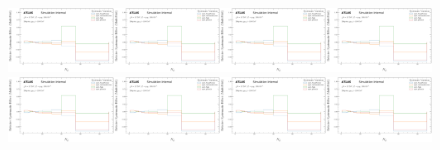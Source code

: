 \begin{figure}[h!]
\includegraphics[width=0.25\textwidth,page=9]{figures/SimResults/MultiFold_TrackJet_SystEffect.pdf}\includegraphics[width=0.25\textwidth,page=10]{figures/SimResults/MultiFold_TrackJet_SystEffect.pdf}\includegraphics[width=0.25\textwidth,page=11]{figures/SimResults/MultiFold_TrackJet_SystEffect.pdf}\includegraphics[width=0.25\textwidth,page=12]{figures/SimResults/MultiFold_TrackJet_SystEffect.pdf}\\
\includegraphics[width=0.25\textwidth,page=13]{figures/SimResults/MultiFold_TrackJet_SystEffect.pdf}\includegraphics[width=0.25\textwidth,page=14]{figures/SimResults/MultiFold_TrackJet_SystEffect.pdf}\includegraphics[width=0.25\textwidth,page=15]{figures/SimResults/MultiFold_TrackJet_SystEffect.pdf}\includegraphics[width=0.25\textwidth,page=16]{figures/SimResults/MultiFold_TrackJet_SystEffect.pdf}\\

\end{figure}
